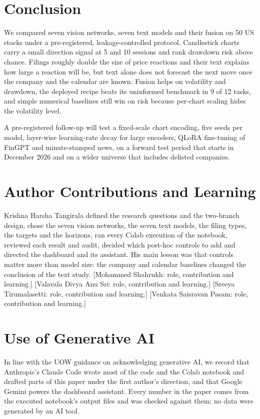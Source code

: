 \documentclass[conference]{IEEEtran}
\begin{document}
\section{Conclusion}

We compared seven vision networks, seven text models and their fusion on 50 US stocks under a pre-registered, leakage-controlled protocol. Candlestick charts carry a small direction signal at 5 and 10 sessions and rank drawdown risk above chance. Filings roughly double the size of price reactions and their text explains how large a reaction will be, but text alone does not forecast the next move once the company and the calendar are known. Fusion helps on volatility and drawdown, the deployed recipe beats its uninformed benchmark in 9 of 12 tasks, and simple numerical baselines still win on risk because per-chart scaling hides the volatility level.

A pre-registered follow-up will test a fixed-scale chart encoding, five seeds per model, layer-wise learning-rate decay for large encoders, QLoRA fine-tuning of FinGPT and minute-stamped news, on a forward test period that starts in December 2026 and on a wider universe that includes delisted companies.

\section*{Author Contributions and Learning}

Krishna Harsha Tangirala defined the research questions and the two-branch design, chose the seven vision networks, the seven text models, the filing types, the targets and the horizons, ran every Colab execution of the notebook, reviewed each result and audit, decided which post-hoc controls to add and directed the dashboard and its assistant. His main lesson was that controls matter more than model size: the company and calendar baselines changed the conclusion of the text study. [Mohammed Shahrukh: role, contribution and learning.] [Valavala Divya Anu Sri: role, contribution and learning.] [Sreeya Tirumalasetti: role, contribution and learning.] [Venkata Saisravan Pasam: role, contribution and learning.]

\section*{Use of Generative AI}

In line with the UOW guidance on acknowledging generative AI, we record that Anthropic's Claude Code wrote most of the code and the Colab notebook and drafted parts of this paper under the first author's direction, and that Google Gemini powers the dashboard assistant. Every number in the paper comes from the executed notebook's output files and was checked against them; no data were generated by an AI tool.
\end{document}
